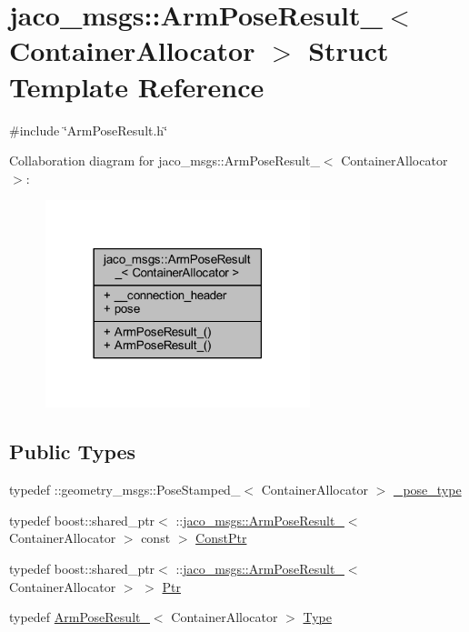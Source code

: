 \hypertarget{structjaco__msgs_1_1ArmPoseResult__}{}\section{jaco\+\_\+msgs\+:\+:Arm\+Pose\+Result\+\_\+$<$ Container\+Allocator $>$ Struct Template Reference}
\label{structjaco__msgs_1_1ArmPoseResult__}


{\ttfamily \#include \char`\"{}Arm\+Pose\+Result.\+h\char`\"{}}



Collaboration diagram for jaco\+\_\+msgs\+:\+:Arm\+Pose\+Result\+\_\+$<$ Container\+Allocator $>$\+:
\nopagebreak
\begin{figure}[H]
\begin{center}
\leavevmode
\includegraphics[width=218pt]{d3/d05/structjaco__msgs_1_1ArmPoseResult____coll__graph}
\end{center}
\end{figure}
\subsection*{Public Types}
\begin{DoxyCompactItemize}
\item 
typedef \+::geometry\+\_\+msgs\+::\+Pose\+Stamped\+\_\+$<$ Container\+Allocator $>$ \hyperlink{structjaco__msgs_1_1ArmPoseResult___a498b066ab7353819251e9a9ca39142bb}{\+\_\+pose\+\_\+type}
\item 
typedef boost\+::shared\+\_\+ptr$<$ \+::\hyperlink{structjaco__msgs_1_1ArmPoseResult__}{jaco\+\_\+msgs\+::\+Arm\+Pose\+Result\+\_\+}$<$ Container\+Allocator $>$ const  $>$ \hyperlink{structjaco__msgs_1_1ArmPoseResult___a1352fbeed485be056735521eb006f518}{Const\+Ptr}
\item 
typedef boost\+::shared\+\_\+ptr$<$ \+::\hyperlink{structjaco__msgs_1_1ArmPoseResult__}{jaco\+\_\+msgs\+::\+Arm\+Pose\+Result\+\_\+}$<$ Container\+Allocator $>$ $>$ \hyperlink{structjaco__msgs_1_1ArmPoseResult___a1a6d5659d134ca48216daf4156ba4fdb}{Ptr}
\item 
typedef \hyperlink{structjaco__msgs_1_1ArmPoseResult__}{Arm\+Pose\+Result\+\_\+}$<$ Container\+Allocator $>$ \hyperlink{structjaco__msgs_1_1ArmPoseResult___a23c9273cfea556f1981dd874db151b5f}{Type}
\end{DoxyCompactItemize}
